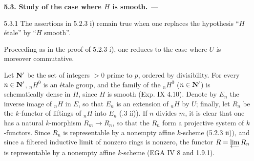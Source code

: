 \par\medskip\noindent\textbf{5.3. Study of the case where $H$ is smooth.}\ ---\par\label{XVII.5.3}
\begin{proposition}{5.3.1}\label{XVII.5.3.1}
The assertions in 5.2.3 i) remain true when one replaces the hypothesis ``$H$ étale'' by ``$H$ smooth''.
\end{proposition}
Proceeding as in the proof of 5.2.3 i), one reduces to the case where $U$ is moreover commutative.

Let $\mathbf{N}'$ be the set of integers $>0$ prime to $p$, ordered by divisibility. For every $n\in\mathbf{N}'$, ${}_nH^0$ is an étale group, and the family of the ${}_nH^0$ ($n\in\mathbf{N}'$) is schematically dense in $H$, since $H$ is smooth (Exp. IX 4.10). Denote by $E_n$ the inverse image of ${}_nH$ in $E$, so that $E_n$ is an extension of ${}_nH$ by $U$; finally, let $R_n$ be the $k$-functor of liftings of ${}_nH$ into $E_n$ (.3 ii)). If $n$ divides $m$, it is clear that one has a natural $k$-morphism $R_m\to R_n$, so that the $R_n$ form a projective system of $k$-functors. Since $R_n$ is representable by a nonempty affine $k$-scheme (5.2.3 ii)), and since a filtered inductive limit of nonzero rings is nonzero, the functor $R=\varprojlim R_n$ is representable by a nonempty affine $k$-scheme (EGA IV 8 and 1.9.1).
